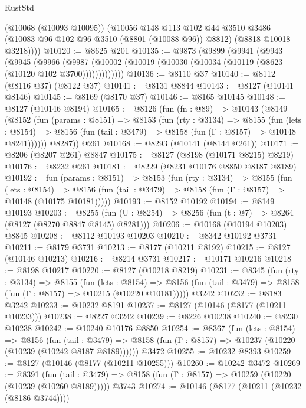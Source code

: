\begin{lexlean}{RustStd}
\begin{coremodule}
        (@10068 (@10093 @10095))
        (@10056
          @148
          @113
          @102
          @44
          @3510
          @3486
          (@10083 @96 @102 @96 @3510 (@8801 (@10088 @96)) @8812)
          (@8818 @10018 @3218))))
@10120 := @8625 @201
@10135 := @9873
    (@9899
      (@9941
        (@9943
          (@9945
            (@9966
              (@9987 (@10002 (@10019 (@10030 (@10034 (@10119 (@8623 (@10120 @102 @3700)))))))))))))
@10136 := @8110 @37
@10140 := @8112 (@8116 @37) (@8122 @37)
@10141 := @8131 @8844
@10143 := @8127 (@10141 @8146)
@10145 := @8169 (@8170 @37)
@10146 := @8165 @10145
@10148 := @8127 (@10146 @8194)
@10165 := @8126
    (fun (fn : @89) =>
    @10143
      (@8149
        (@8152
          (fun (params : @8151) =>
          @8153
            (fun (rty : @3134) =>
            @8155
              (fun (lets : @8154) =>
              @8156 (fun (tail : @3479) => @8158 (fun (Γ : @8157) => @10148 @8241))))))
        @8287))
    @261
@10168 := @8293 (@10141 (@8144 @261))
@10171 := @8206 (@8207 @261) @8847
@10175 := @8127 (@8198 (@10171 @8215) @8219)
@10176 := @8232 @261
@10181 := @8229 (@8231 @10176 @8850 @8187 @8189)
@10192 := fun (params : @8151) =>
  @8153
    (fun (rty : @3134) =>
    @8155
      (fun (lets : @8154) =>
      @8156 (fun (tail : @3479) => @8158 (fun (Γ : @8157) => @10148 (@10175 @10181)))))
@10193 := @8152 @10192
@10194 := @8149 @10193
@10203 := @8255 (fun (U : @8254) => @8256 (fun (t : @7) => @8264 (@8127 (@8270 @8847 @8145) @8281)))
@10206 := @10168 (@10194 @10203) @8845
@10208 := @8112 @10193 @10203
@10210 := @8342 @10192 @3731
@10211 := @8179 @3731
@10213 := @8177 (@10211 @8192)
@10215 := @8127 (@10146 @10213)
@10216 := @8214 @3731
@10217 := @10171 @10216
@10218 := @8198 @10217
@10220 := @8127 (@10218 @8219)
@10231 := @8345
    (fun (rty : @3134) =>
    @8155
      (fun (lets : @8154) =>
      @8156 (fun (tail : @3479) => @8158 (fun (Γ : @8157) => @10215 (@10220 @10181)))))
    @3242
@10232 := @8183 @3242
@10233 := @10232 @8191
@10237 := @8127 (@10146 (@8177 (@10211 @10233)))
@10238 := @8227 @3242
@10239 := @8226 @10238
@10240 := @8230 @10238
@10242 := @10240 @10176 @8850
@10254 := @8367
    (fun (lets : @8154) =>
    @8156
      (fun (tail : @3479) =>
      @8158 (fun (Γ : @8157) => @10237 (@10220 (@10239 (@10242 @8187 @8189))))))
    @3472
@10255 := @10232 @8393
@10259 := @8127 (@10146 (@8177 (@10211 @10255)))
@10260 := @10242 @3472
@10269 := @8391
    (fun (tail : @3479) => @8158 (fun (Γ : @8157) => @10259 (@10220 (@10239 (@10260 @8189)))))
    @3743
@10274 := @10146 (@8177 (@10211 (@10232 (@8186 @3744))))

\end{coremodule}
\end{lexlean}
